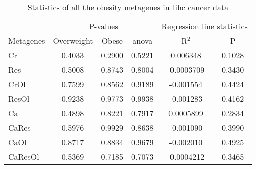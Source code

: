\begin{appendices}
\begin{table}[htpb]
	\centering
	\caption{Statistics of all the obesity metagenes in \gls{lihc} cancer data}
	\label{tab:degmetalihc}
	\begin{threeparttable}
		\begin{tabular}{lccccc}
			& \multicolumn{3}{c}{ P-values} & \multicolumn{2}{c}{ Regression line statistics}\\
			\cmidrule(r){2-4} \cmidrule(r){5-6}
			Metagenes &  Overweight &  Obese &  \gls{anova} &  R$^2$ &  P \\
			\hline
			\hline
			\rule{0pt}{2.25ex}Cr      & 0.4033                      & 0.2900  & 0.5221             & 0.006348   & 0.1028              \\
            Res     & 0.5008                      & 0.8743  & 0.8004             & -0.0003709 & 0.3430              \\
            CrOl    & 0.7599                      & 0.8562  & 0.9189             & -0.001554  & 0.4424              \\
            ResOl   & 0.9238                      & 0.9773  & 0.9938             & -0.001283  & 0.4162              \\
            Ca      & 0.4898                      & 0.8221  & 0.7917             & 0.0005899  & 0.2834              \\
            CaRes   & 0.5976                      & 0.9929  & 0.8638             & -0.001090  & 0.3990              \\
            CaOl    & 0.8717                      & 0.8834  & 0.9679             & -0.002010  & 0.4925              \\
            CaResOl & 0.5369                      & 0.7185  & 0.7073             & -0.0004212 & 0.3465              \\
			\hline
			\hline
		\end{tabular}
	\end{threeparttable}
\end{table}


\end{appendices}

